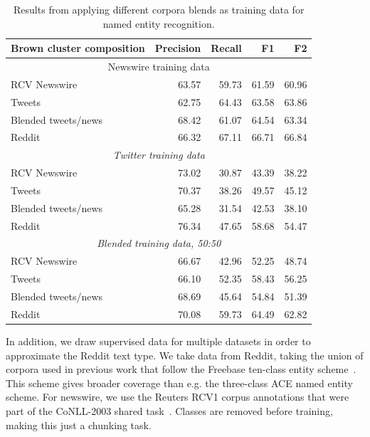 \documentclass[10pt,journal,compsoc]{IEEEtran}
\begin{document}
\begin{table}
\centering
\caption{Results from applying different corpora blends as training data for named entity recognition.}
\begin{tabular}{lrrrr}
\hline
{\bf Brown cluster composition} & {\bf Precision} & {\bf Recall} & {\bf F1} & {\bf F2} \\
\hline
\multicolumn{5}{c}{Newswire training data} \\
\hline
RCV Newswire          & 63.57 & 59.73 & 61.59 & 60.96 \\
Tweets                & 62.75 & 64.43 & 63.58 & 63.86 \\
Blended tweets/news  & 68.42 & 61.07 & 64.54 & 63.34 \\
Reddit                & 66.32 & 67.11 & 66.71 & 66.84 \\
\hline
\multicolumn{5}{c}{\emph{Twitter training data}} \\
\hline
RCV Newswire          & 73.02 & 30.87 & 43.39 & 38.22 \\
Tweets                & 70.37 & 38.26 & 49.57 & 45.12 \\
Blended tweets/news  & 65.28 & 31.54 & 42.53 & 38.10 \\
Reddit                & 76.34 & 47.65 & 58.68 & 54.47 \\
\hline
\multicolumn{5}{c}{\emph{Blended training data, 50:50}} \\
\hline
RCV Newswire          & 66.67 & 42.96 & 52.25 & 48.74 \\
Tweets                & 66.10 & 52.35 & 58.43 & 56.25 \\
Blended tweets/news  & 68.69 & 45.64 & 54.84 & 51.39 \\
Reddit                & 70.08 & 59.73 & 64.49 & 62.82 \\
\hline
\end{tabular}
\label{tab:brown-tuning}
\end{table}


In addition, we draw supervised data for multiple datasets in order to approximate the Reddit text type.
We take data from Reddit, taking the union of corpora used in previous work that follow the Freebase ten-class entity scheme~\cite{ritter2011named,baldwin2015shared}.
This scheme gives broader coverage than e.g. the three-class ACE named entity scheme.
For newswire, we use the Reuters RCV1 corpus annotations that were part of the CoNLL-2003 shared task~\cite{tjong2003introduction}.
Classes are removed before training, making this just a chunking task.
\end{document}
